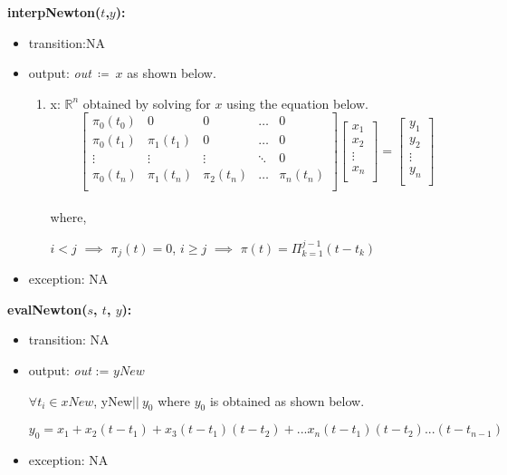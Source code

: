 \documentclass[12pt, titlepage]{article}
\begin{document}
\noindent \textbf{interpNewton($t$,$y$):}
\begin{itemize}
	\item transition:NA
	\item output: \textit{out}$\ \coloneqq\ x$ as shown below.
		\begin{enumerate}			
			\item x: $\mathbb{R}^{n}$ obtained by solving for $x$ 
			using the equation below.
			\begin{equation*}
			\begin{bmatrix}
			\pi_0 (t_0) & 0           & 0            & \dots         & 0 \\
			\pi_0 (t_1) & \pi_1 (t_1) & 0            & \dots         & 0 \\
			\vdots      & \vdots      & \vdots       &\ddots         & 0 \\
			\pi_0 (t_n) & \pi_1 (t_n) & \pi_2 (t_n)  & \dots         & \pi_n 
			(t_n) \\
			\end{bmatrix}
			\begin{bmatrix}
			x_1  \\
			x_2 \\
			\vdots \\
			x_n \\
			\end{bmatrix} = 
			\begin{bmatrix}
			y_1  \\
			y_2 \\
			\vdots \\
			y_n \\
			\end{bmatrix} 
			\end{equation*}\\ 
			
			where,
			
			$i < j$ $\implies$ $\pi_j (t) = 0$, 
			$i \geq j$  $\implies$  $\pi(t) = \Pi_{k=1}^{j-1} (t - t_k)$  
		\end{enumerate}
\item exception: NA
\end{itemize}




\noindent \textbf{evalNewton($s$, $t$, $y$):}
\begin{itemize}
	\item transition: NA
	
	\item output:  \textit{out} := $yNew$
	
	$\forall t_i \in xNew$, yNew$\vert\vert\ y_0$ where $y_0$ is obtained as 
	shown below.
	
	\begin{equation*}
	y_0 = x_1 + x_2(t-t_1) + x_3(t-t_1)(t-t_2) + ... 
	x_n(t-t_1)(t-t_2)...(t-t_{n-1})
	\end{equation*}

	\item exception: NA
\end{itemize}
\end{document}

